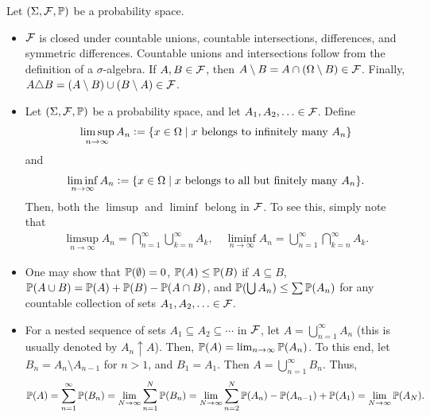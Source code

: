 \begin{example}
    Let $(\Sigma,\mathcal{F},\mathbb{P})$ be a probability space.
    
    \begin{itemize}
        \item $\mathcal{F}$ is closed under countable unions, countable intersections, differences, and symmetric differences. Countable unions and intersections follow from the definition of a $\sigma$-algebra. If $A,B \in \mathcal{F}$, then $A \setminus B = A \cap (\Omega \setminus B) \in \mathcal{F}$. Finally, $A \triangle B = (A \setminus B) \cup (B \setminus A) \in \mathcal{F}$.

        \item Let $(\Sigma,\mathcal{F},\mathbb{P})$ be a probability space, and let $A_{1},A_{2},\ldots \in \mathcal{F}$. Define
        \begin{align}
            \limsup_{n \to \infty} A_{n} \vcentcolon= \{x \in \Omega \mid x \text{ belongs to infinitely many } A_{n}\}
        \end{align}
        and
        \begin{align}
            \liminf_{n \to \infty} A_{n} \vcentcolon= \{x \in \Omega \mid x \text{ belongs to all but finitely many } A_{n}\}.
        \end{align}
        Then, both the $\limsup$ and $\liminf$ belong in $\mathcal{F}$. To see this, simply note that
        \begin{align}
            \limsup_{n \to \infty} A_{n} = \bigcap_{n=1}^{\infty}\bigcup_{k=n}^{\infty}A_{k}, \quad \liminf_{n \to \infty} A_{n} = \bigcup_{n=1}^{\infty}\bigcap_{k=n}^{\infty}A_{k}.
        \end{align}

        \item One may show that $\mathbb{P}(\emptyset) = 0$, $\mathbb{P}(A) \leq \mathbb{P}(B)$ if $A \subseteq B$, $\mathbb{P}(A \cup B) = \mathbb{P}(A) + \mathbb{P}(B) - \mathbb{P}(A \cap B)$, and $\mathbb{P}(\bigcup A_{n}) \leq \sum \mathbb{P}(A_{n})$ for any countable collection of sets $A_{1},A_{2},\ldots \in \mathcal{F}$.
        
        \item For a nested sequence of sets $A_{1} \subseteq A_{2} \subseteq \cdots$ in $\mathcal{F}$, let $A = \bigcup_{n=1}^{\infty}A_{n}$ (this is usually denoted by $A_{n} \uparrow A$). Then, $\mathbb{P}(A) = \lim_{n \to \infty}\mathbb{P}(A_{n})$. To this end, let $B_{n} = A_{n}\setminus A_{n-1}$ for $n > 1$, and $B_{1} = A_{1}$. Then $A = \bigcup_{n=1}^{\infty}B_{n}$. Thus,
        \begin{align}
            \mathbb{P}(A) = \sum_{n=1}^{\infty}\mathbb{P}(B_{n}) = \lim_{N \to \infty}\sum_{n=1}^{N}\mathbb{P}(B_{n}) = \lim_{N \to \infty}\sum_{n=2}^{N} \mathbb{P}(A_{n}) - \mathbb{P}(A_{n-1}) + \mathbb{P}(A_{1}) = \lim_{N \to \infty}\mathbb{P}(A_{N}).
        \end{align}
    \end{itemize}    
\end{example}


